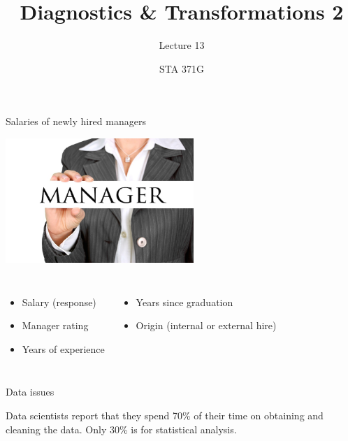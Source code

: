 \documentclass{beamer}\usepackage[]{graphicx}\usepackage[]{color}
\title{Diagnostics \& Transformations 2}
\subtitle{Lecture 13}
\author{STA 371G}
\begin{document}
  
  

  \frame{\maketitle}



  \begin{darkframes}
    \begin{frame}{Salaries of newly hired managers}
      \begin{center}
        \includegraphics[width=2.8in]{manager} \\
      \end{center} \pause
      
      \begin{columns}[onlytextwidth]
          \begin{itemize}
            \item Salary (response)
            \item Manager rating
            \item Years of experience
          \end{itemize}
          \begin{itemize}
            \item Years since graduation
            \item Origin (internal or external hire)
          \end{itemize}
      \end{columns}
    \end{frame}
   
    \begin{frame}[fragile]{Data issues}
      \begin{center}
        Data scientists report that they spend \alert{70\% of their time on obtaining and cleaning the data}. Only 30\% is for statistical analysis.\bigskip \pause
        

\end{center}
\end{frame}
\end{darkframes}
\end{document}
